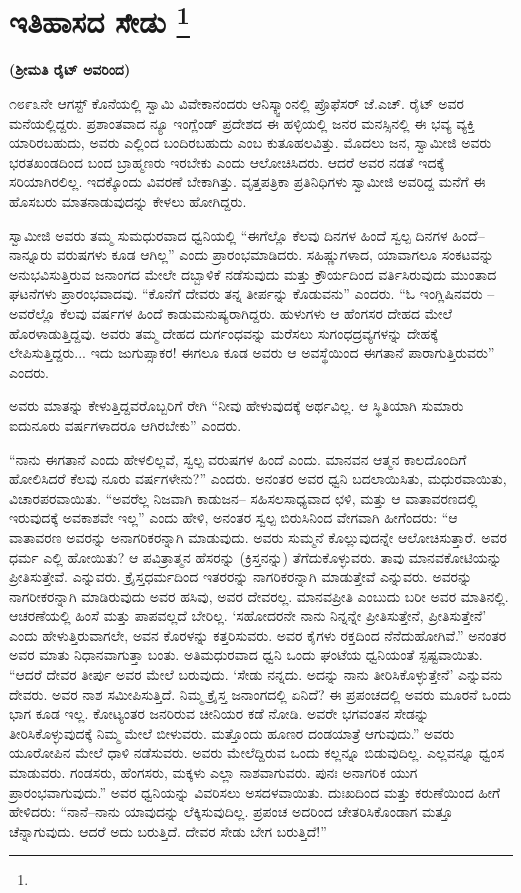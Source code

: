 
\chapter[ಇತಿಹಾಸದ ಸೇಡು ]{ಇತಿಹಾಸದ ಸೇಡು \protect\footnote{}}

\centerline{\textbf{(ಶ‍್ರೀಮತಿ ರೈಟ್​ ಅವರಿಂದ)}}

೧೮೯೩ನೇ ಆಗಸ್ಟ್​ ಕೊನೆಯಲ್ಲಿ ಸ್ವಾಮಿ ವಿವೇಕಾನಂದರು ಆನಿಸ್ಕ್ವಾಂನಲ್ಲಿ ಪ್ರೊಫೆಸರ್​ ಜೆ.ಎಚ್​. ರೈಟ್​ ಅವರ ಮನೆಯಲ್ಲಿದ್ದರು. ಪ್ರಶಾಂತವಾದ ನ್ಯೂ ಇಂಗ್ಲೆಂಡ್​ ಪ್ರದೇಶದ ಈ ಹಳ್ಳಿಯಲ್ಲಿ ಜನರ ಮನಸ್ಸಿನಲ್ಲಿ ಈ ಭವ್ಯ ವ್ಯಕ್ತಿ ಯಾರಿರಬಹುದು, ಅವರು ಎಲ್ಲಿಂದ ಬಂದಿರಬಹುದು ಎಂಬ ಕುತೂಹಲವಿತ್ತು. ಮೊದಲು ಜನ, ಸ್ವಾಮೀಜಿ ಅವರು ಭರತಖಂಡದಿಂದ ಬಂದ ಬ್ರಾಹ್ಮಣರು ಇರಬೇಕು ಎಂದು ಆಲೋಚಿಸಿದರು. ಆದರೆ ಅವರ ನಡತೆ ಇದಕ್ಕೆ ಸರಿಯಾಗಿರಲಿಲ್ಲ. ಇದಕ್ಕೊಂದು ವಿವರಣೆ ಬೇಕಾಗಿತ್ತು. ವೃತ್ತಪತ್ರಿಕಾ ಪ್ರತಿನಿಧಿಗಳು ಸ್ವಾಮೀಜಿ ಅವರಿದ್ದ ಮನೆಗೆ ಈ ಹೊಸಬರು ಮಾತನಾಡುವುದನ್ನು ಕೇಳಲು ಹೋಗಿದ್ದರು.

ಸ್ವಾಮೀಜಿ ಅವರು ತಮ್ಮ ಸುಮಧುರವಾದ ಧ್ವನಿಯಲ್ಲಿ “ಈಗೆಲ್ಲೊ ಕೆಲವು ದಿನಗಳ ಹಿಂದೆ ಸ್ವಲ್ಪ ದಿನಗಳ ಹಿಂದೆ–ನಾನ್ನೂರು ವರುಷಗಳು ಕೂಡ ಆಗಿಲ್ಲ” ಎಂದು ಪ್ರಾರಂಭಮಾಡಿದರು. ಸಹಿಷ್ಣುಗಳಾದ, ಯಾವಾಗಲೂ ಸಂಕಟವನ್ನು ಅನುಭವಿಸುತ್ತಿರುವ ಜನಾಂಗದ ಮೇಲೇ ದಬ್ಬಾಳಿಕೆ ನಡೆಸುವುದು ಮತ್ತು ಕ್ರೌರ್ಯದಿಂದ ವರ್ತಿಸಿರುವುದು ಮುಂತಾದ ಘಟನೆಗಳು ಪ್ರಾರಂಭವಾದವು. “ಕೊನೆಗೆ ದೇವರು ತನ್ನ ತೀರ್ಪನ್ನು ಕೊಡುವನು” ಎಂದರು. “ಓ ಇಂಗ್ಲಿಷಿನವರು – ಅವರೆಲ್ಲೊ ಕೆಲವು ವರ್ಷಗಳ ಹಿಂದೆ ಕಾಡುಮನುಷ್ಯರಾಗಿದ್ದರು. ಹುಳುಗಳು ಆ ಹೆಂಗಸರ ದೇಹದ ಮೇಲೆ ಹೊರಳಾಡುತ್ತಿದ್ದವು. ಅವರು ತಮ್ಮ ದೇಹದ ದುರ್ಗಂಧವನ್ನು ಮರೆಸಲು ಸುಗಂಧದ್ರವ್ಯಗಳನ್ನು ದೇಹಕ್ಕೆ ಲೇಪಿಸುತ್ತಿದ್ದರು... ಇದು ಜುಗುಪ್ಸಾಕರ! ಈಗಲೂ ಕೂಡ ಅವರು ಆ ಅವಸ್ಥೆಯಿಂದ ಈಗತಾನೆ ಪಾರಾಗುತ್ತಿರುವರು” ಎಂದರು.

ಅವರು ಮಾತನ್ನು ಕೇಳುತ್ತಿದ್ದವರೊಬ್ಬರಿಗೆ ರೇಗಿ “ನೀವು ಹೇಳುವುದಕ್ಕೆ ಅರ್ಥವಿಲ್ಲ. ಆ ಸ್ಥಿತಿಯಾಗಿ ಸುಮಾರು ಐದುನೂರು ವರ್ಷಗಳಾದರೂ ಆಗಿರಬೇಕು” ಎಂದರು.

“ನಾನು ಈಗತಾನೆ ಎಂದು ಹೇಳಲಿಲ್ಲವೆ, ಸ್ವಲ್ಪ ವರುಷಗಳ ಹಿಂದೆ ಎಂದು. ಮಾನವನ ಆತ್ಮನ ಕಾಲದೊಂದಿಗೆ ಹೋಲಿಸಿದರೆ ಕೆಲವು ನೂರು ವರ್ಷಗಳೇನು?” ಎಂದರು. ಅನಂತರ ಅವರ ಧ್ವನಿ ಬದಲಾಯಿಸಿತು, ಮಧುರವಾಯಿತು, ವಿಚಾರಪರವಾಯಿತು. “ಅವರೆಲ್ಲ ನಿಜವಾಗಿ ಕಾಡುಜನ– ಸಹಿಸಲಸಾಧ್ಯವಾದ ಛಳಿ, ಮತ್ತು ಆ ವಾತಾವರಣದಲ್ಲಿ ಇರುವುದಕ್ಕೆ ಅವಕಾಶವೇ ಇಲ್ಲ” ಎಂದು ಹೇಳಿ, ಅನಂತರ ಸ್ವಲ್ಪ ಬಿರುಸಿನಿಂದ ವೇಗವಾಗಿ ಹೀಗೆಂದರು: “ಆ ವಾತಾವರಣ ಅವರನ್ನು ಅನಾಗರಿಕರನ್ನಾಗಿ ಮಾಡುವುದು. ಅವರು ಸುಮ್ಮನೆ ಕೊಲ್ಲುವುದನ್ನೇ ಆಲೋಚಿಸುತ್ತಾರೆ. ಅವರ ಧರ್ಮ ಎಲ್ಲಿ ಹೋಯಿತು? ಆ ಪವಿತ್ರಾತ್ಮನ ಹೆಸರನ್ನು (ಕ್ರಿಸ್ತನನ್ನು) ತೆಗೆದುಕೊಳ್ಳುವರು. ತಾವು ಮಾನವಕೋಟಿಯನ್ನು ಪ್ರೀತಿಸುತ್ತೇವೆ. ಎನ್ನುವರು. ಕ್ರೈಸ್ತಧರ್ಮದಿಂದ ಇತರರನ್ನು ನಾಗರಿಕರನ್ನಾಗಿ ಮಾಡುತ್ತೇವೆ ಎನ್ನುವರು. ಅವರನ್ನು ನಾಗರೀಕರನ್ನಾಗಿ ಮಾಡಿರುವುದು ಅವರ ಹಸಿವು, ಅವರ ದೇವರಲ್ಲ. ಮಾನವಪ್ರೀತಿ ಎಂಬುದು ಬರೀ ಅವರ ಮಾತಿನಲ್ಲಿ. ಆಚರಣೆಯಲ್ಲಿ ಹಿಂಸೆ ಮತ್ತು ಪಾಪವಲ್ಲದೆ ಬೇರಿಲ್ಲ. ‘ಸಹೋದರನೇ ನಾನು ನಿನ್ನನ್ನೇ ಪ್ರೀತಿಸುತ್ತೇನೆ, ಪ್ರೀತಿಸುತ್ತೇನೆ’ ಎಂದು ಹೇಳುತ್ತಿರುವಾಗಲೇ, ಅವನ ಕೊರಳನ್ನು ಕತ್ತರಿಸುವರು. ಅವರ ಕೈಗಳು ರಕ್ತದಿಂದ ನೆನೆದುಹೋಗಿವೆ.” ಅನಂತರ ಅವರ ಮಾತು ನಿಧಾನವಾಗುತ್ತಾ ಬಂತು. ಅತಿಮಧುರವಾದ ಧ್ವನಿ ಒಂದು ಘಂಟೆಯ ಧ್ವನಿಯಂತೆ ಸ್ಪಷ್ಟವಾಯಿತು. “ಆದರೆ ದೇವರ ತೀರ್ಪು ಅವರ ಮೇಲೆ ಬರುವುದು. ‘ಸೇಡು ನನ್ನದು. ಅದನ್ನು ನಾನು ತೀರಿಸಿಕೊಳ್ಳುತ್ತೇನೆ’ ಎನ್ನುವನು ದೇವರು. ಅವರ ನಾಶ ಸಮೀಪಿಸುತ್ತಿದೆ. ನಿಮ್ಮ ಕ್ರೈಸ್ತ ಜನಾಂಗದಲ್ಲಿ ಏನಿದೆ? ಈ ಪ್ರಪಂಚದಲ್ಲಿ ಅವರು ಮೂರನೆ ಒಂದು ಭಾಗ ಕೂಡ ಇಲ್ಲ. ಕೋಟ್ಯಂತರ ಜನರಿರುವ ಚೀನಿಯರ ಕಡೆ ನೋಡಿ. ಅವರೇ ಭಗವಂತನ ಸೇಡನ್ನು ತೀರಿಸಿಕೊಳ್ಳುವುದಕ್ಕೆ ನಿಮ್ಮ ಮೇಲೆ ಬೀಳುವರು. ಮತ್ತೊಂದು ಹೂಣರ ದಂಡಯಾತ್ರೆ ಆಗುವುದು.” ಅವರು ಯೂರೋಪಿನ ಮೇಲೆ ಧಾಳಿ ನಡೆಸುವರು. ಅವರು ಮೇಲೆದ್ದಿರುವ ಒಂದು ಕಲ್ಲನ್ನೂ ಬಿಡುವುದಿಲ್ಲ. ಎಲ್ಲವನ್ನೂ ಧ್ವಂಸ ಮಾಡುವರು. ಗಂಡಸರು, ಹೆಂಗಸರು, ಮಕ್ಕಳು ಎಲ್ಲಾ ನಾಶವಾಗುವರು. ಪುನಃ ಅನಾಗರಿಕ ಯುಗ ಪ್ರಾರಂಭವಾಗುವುದು.” ಅವರ ಧ್ವನಿಯನ್ನು ವಿವರಿಸಲು ಅಸದಳವಾಯಿತು. ದುಃಖದಿಂದ ಮತ್ತು ಕರುಣೆಯಿಂದ ಹೀಗೆ ಹೇಳಿದರು: “ನಾನೆ–ನಾನು ಯಾವುದನ್ನು ಲೆಕ್ಕಿಸುವುದಿಲ್ಲ. ಪ್ರಪಂಚ ಅದರಿಂದ ಚೇತರಿಸಿಕೊಂಡಾಗ ಮತ್ತೂ ಚೆನ್ನಾಗುವುದು. ಆದರೆ ಅದು ಬರುತ್ತಿದೆ. ದೇವರ ಸೇಡು ಬೇಗ ಬರುತ್ತಿದೆ!”

